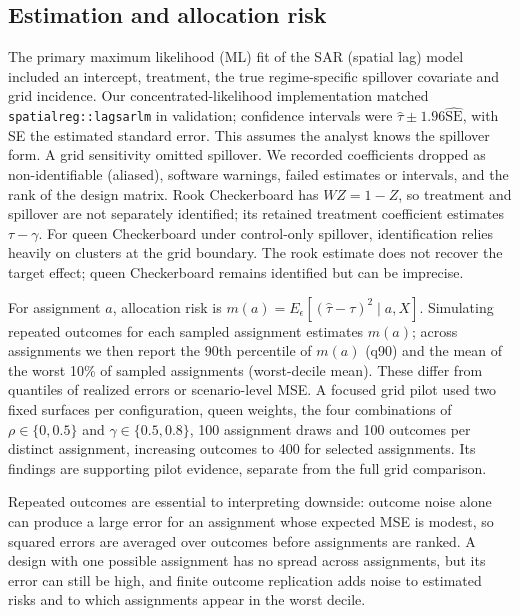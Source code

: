 \documentclass[Afour,sagev,times]{sagej}
\begin{document}
\subsection{Estimation and allocation risk}
The primary maximum likelihood (ML) fit of the SAR (spatial lag) model included an intercept, treatment, the true regime-specific spillover covariate and grid incidence. Our concentrated-likelihood implementation matched \texttt{spatialreg::lagsarlm} in validation; confidence intervals were $\hat\tau\pm1.96\widehat{\mathrm{SE}}$, with SE the estimated standard error.\cite{ord_estimation_1975,bivand_comparing_2015} This assumes the analyst knows the spillover form. A grid sensitivity omitted spillover. We recorded coefficients dropped as non-identifiable (aliased), software warnings, failed estimates or intervals, and the rank of the design matrix. Rook Checkerboard has $WZ=1-Z$, so treatment and spillover are not separately identified; its retained treatment coefficient estimates $\tau-\gamma$. For queen Checkerboard under control-only spillover, identification relies heavily on clusters at the grid boundary. The rook estimate does not recover the target effect; queen Checkerboard remains identified but can be imprecise.

For assignment $a$, allocation risk is $m(a)=E_\epsilon[(\hat\tau-\tau)^2\mid a,X]$. Simulating repeated outcomes for each sampled assignment estimates $m(a)$; across assignments we then report the 90th percentile of $m(a)$ (q90) and the mean of the worst 10\% of sampled assignments (worst-decile mean). These differ from quantiles of realized errors or scenario-level MSE. A focused grid pilot used two fixed surfaces per configuration, queen weights, the four combinations of $\rho\in\{0,0.5\}$ and $\gamma\in\{0.5,0.8\}$, 100 assignment draws and 100 outcomes per distinct assignment, increasing outcomes to 400 for selected assignments. Its findings are supporting pilot evidence, separate from the full grid comparison.

Repeated outcomes are essential to interpreting downside: outcome noise alone can produce a large error for an assignment whose expected MSE is modest, so squared errors are averaged over outcomes before assignments are ranked. A design with one possible assignment has no spread across assignments, but its error can still be high, and finite outcome replication adds noise to estimated risks and to which assignments appear in the worst decile.
\end{document}
